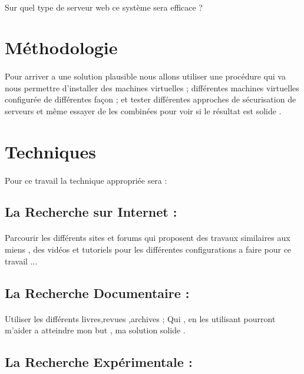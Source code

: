 \documentclass{report}
\begin{document}
   \paragraph{ }
   \textendash \space Sur quel type de serveur web ce système sera efficace ?
   \section{Méthodologie}
   \paragraph{ }
   Pour arriver a une solution plausible  nous allons utiliser une procédure  qui va nous permettre d'installer des machines virtuelles ; différentes machines virtuelles configurée de différentes façon  ;  et tester différentes approches de sécurisation de serveurs et même essayer de les combinées pour voir si le résultat est solide .
  \section{ Techniques }
  \paragraph{ }
  Pour ce travail la technique appropriée sera :
  \subsection{ La Recherche sur Internet :}
  \paragraph{ }
  Parcourir les différents  sites et forums qui proposent des travaux similaires aux miens , des vidéos et tutoriels pour les différentes configurations a faire  pour ce travail ...
    \subsection{La Recherche Documentaire :}
    \paragraph{ }
    Utiliser les différents livres,revues ,archives ;
    Qui , en les utilisant pourront m'aider a atteindre mon but , ma solution solide .
  \subsection{ La Recherche Expérimentale :}
\end{document}
